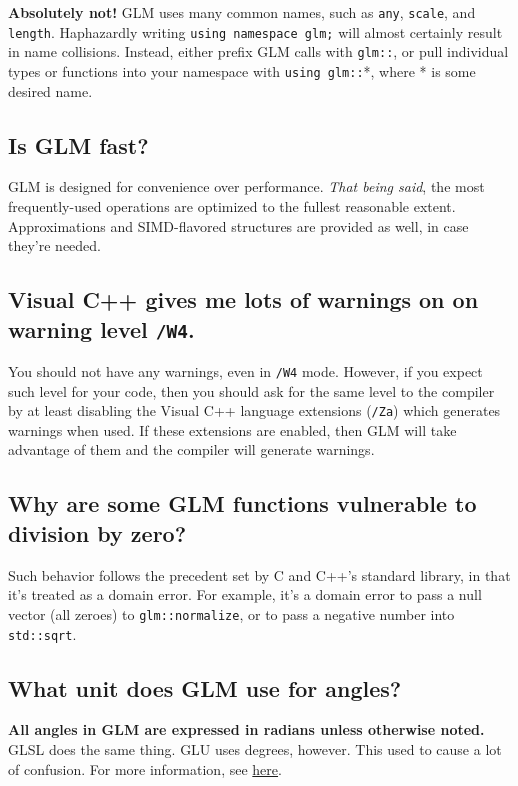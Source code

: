 \documentclass{scrartcl}
\numberwithin{figure}{subsection}
\begin{document}
\textbf{Absolutely not!}  GLM uses many common names, such as \verb|any|, \verb|scale|, and \verb|length|.  Haphazardly writing \verb|using namespace glm;| will almost certainly result in name collisions.  Instead, either prefix GLM calls with \verb|glm::|, or pull individual types or functions into your namespace with \verb|using glm::|*, where * is some desired name.

\subsection{Is GLM fast?}

GLM is designed for convenience over performance.  \emph{That being said}, the most frequently-used operations are optimized to the fullest reasonable extent.  Approximations and SIMD-flavored structures are provided as well, in case they're needed.

\subsection{Visual C++ gives me lots of warnings on on warning level \texttt{/W4}.}

You should not have any warnings, even in \verb|/W4| mode. However, if you expect such level for your code, then you should ask for the same level to the compiler by at least disabling the Visual C++ language extensions (\verb|/Za|) which generates warnings when used. If these extensions are enabled, then GLM will take advantage of them and the compiler will generate warnings.

\subsection{Why are some GLM functions vulnerable to division by zero?}

Such behavior follows the precedent set by C and C++'s standard library, in that it's treated as a domain error. For example, it's a domain error to pass a null vector (all zeroes) to \verb|glm::normalize|, or to pass a negative number into \verb|std::sqrt|.

\subsection{What unit does GLM use for angles?}

\textbf{All angles in GLM are expressed in radians unless otherwise noted.}  GLSL does the same thing.  GLU uses degrees, however.  This used to cause a lot of confusion.  For more information, see \href{http://www.g-truc.net/post-0693.html#menu}{here}.
\end{document}
